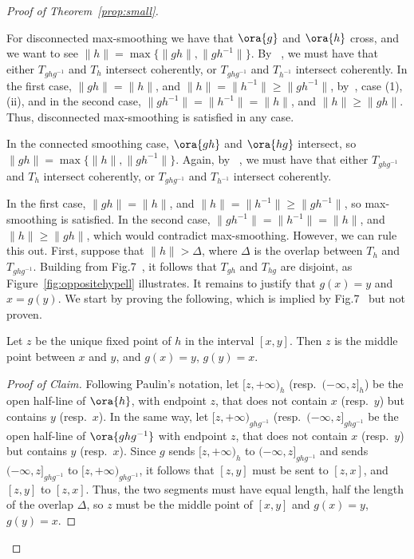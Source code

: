 \begin{proof}[Proof of Theorem~\ref{prop:small}]
\begin{enumerate}[wide, labelindent=0pt]
\begin{enumerate}
\begin{itemize}[wide, labelindent=0pt]
For disconnected max-smoothing we have that $\ora{g}$ and $\ora{h}$ cross, and we want to see $\| h \| = \max \{ \|gh\| , \|gh^{-1}\| \}$.
By ~\cite[Proposition~1.7]{Pa89:Paulin1989TheGT}, we must have that either $T_{g h g^{-1}}$ and $T_{h}$ intersect coherently, or $T_{g h g^{-1}}$ and $T_{h^{-1}}$ intersect coherently. In the first case, $\| gh \| = \| h \|$, and $\| h \| = \| h^{-1} \|\geq \| gh^{-1} \|$, by~\cite[Proposition~1.7]{Pa89:Paulin1989TheGT}, case (1), (ii), and in the second case, $\| gh^{-1} \| = \| h^{-1} \|=\| h \|$, and $\| h \| \geq \| gh \|$. Thus, disconnected max-smoothing is satisfied in any case.

In the connected smoothing case, $\ora{gh}$ and $\ora{hg}$ intersect, so~$\| gh \| = \max \{ \|h\| , \|gh^{-1}\| \}$.
Again, by ~\cite[Proposition~1.7]{Pa89:Paulin1989TheGT}, we must have that either $T_{g h g^{-1}}$ and $T_{h}$ intersect coherently, or $T_{g h g^{-1}}$ and $T_{h^{-1}}$ intersect coherently. 

In the first case, $\| gh \| = \| h \|$, and $\| h \| = \| h^{-1} \|\geq \| gh^{-1} \|$, so max-smoothing is satisfied. 
In the second case, $\| gh^{-1} \| = \| h^{-1} \|=\| h \|$, and $\| h \| \geq \| gh \|$, which would contradict max-smoothing.
However, we can rule this out. First, suppose that $\| h \| > \Delta$, where $\Delta$ is the overlap between $T_{h}$ and $T_{g h g^{-1}}$. Building from Fig.7~\cite[Proposition~1.7]{Pa89:Paulin1989TheGT}, it follows that $T_{gh}$ and $T_{hg}$ are disjoint, as Figure~\ref{fig:oppositehypell} illustrates. 
It remains to justify that $g(x)=y$ and $x=g(y)$. We start by proving the following, which is implied by  Fig.7~\cite[Proposition~1.7]{Pa89:Paulin1989TheGT} but not proven.

\begin{claim}Let $z$ be the unique fixed point of $h$ in the interval $[x,y]$. Then $z$ is the middle point between $x$ and $y$, and $g(x)=y$, $g(y)=x$.\end{claim}
\begin{proof}[Proof of Claim]
Following Paulin's notation, let $[z, +\infty)_{h}$ (resp.\ $(-\infty,
z]_{h}$)  be the open half-line of $\ora{h}$, with endpoint $z$, that
does not contain $x$ (resp.\ $y$) but
contains $y$ (resp.\ $x$). In the same way, let $[z,
+\infty)_{ghg^{-1}}$ (resp.\ $(-\infty, z]_{ghg^{-1}}$ be the
open half-line of $\ora{ghg^{-1}}$ with endpoint $z$, that does not contain $x$ (resp.\ $y$) but
contains $y$ (resp.\ $x$). Since $g$ sends $[z, +\infty)_{h}$ to $(-\infty, z]_{ghg^{-1}}$ and sends $(-\infty, z]_{ghg^{-1}}$ to $[z, +\infty)_{ghg^{-1}}$, it follows that $[z,y]$ must be sent to $[z,x]$, and $[z,y]$ to $[z,x]$. Thus, the two segments must have equal length, half the length of the overlap $\Delta$, so $z$ must be the middle point of $[x,y]$ and $g(x)=y$, $g(y)=x$. 
\end{proof}


\end{itemize}
\end{enumerate}
\end{enumerate}
\end{proof}
